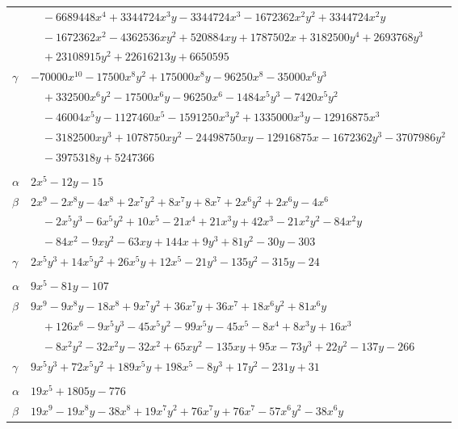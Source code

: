 \documentclass[11pt]{article}
\begin{document}
\begin{longtable}{@{}ll@{}}
 & $\quad -6689448x^{4}+3344724x^{3}y-3344724x^{3}-1672362x^{2}y^{2}+3344724x^{2}y$\\
 & $\quad -1672362x^{2}-4362536xy^{2}+520884xy+1787502x+3182500y^{4}+2693768y^{3}$\\
 & $\quad +23108915y^{2}+22616213y+6650595$\\
$\gamma$ & $-70000x^{10}-17500x^{8}y^{2}+175000x^{8}y-96250x^{8}-35000x^{6}y^{3}$\\
 & $\quad +332500x^{6}y^{2}-17500x^{6}y-96250x^{6}-1484x^{5}y^{3}-7420x^{5}y^{2}$\\
 & $\quad -46004x^{5}y-1127460x^{5}-1591250x^{3}y^{2}+1335000x^{3}y-12916875x^{3}$\\
 & $\quad -3182500xy^{3}+1078750xy^{2}-24498750xy-12916875x-1672362y^{3}-3707986y^{2}$\\
 & $\quad -3975318y+5247366$\\
\addlinespace[3pt]
\multicolumn{2}{@{}l}{$\{i,j\}=\{13,26\}$, $k_{ij}=3^{4}\cdot 7$}\\
$\alpha$ & $2x^{5}-12y-15$\\
$\beta$ & $2x^{9}-2x^{8}y-4x^{8}+2x^{7}y^{2}+8x^{7}y+8x^{7}+2x^{6}y^{2}+2x^{6}y-4x^{6}$\\
 & $\quad -2x^{5}y^{3}-6x^{5}y^{2}+10x^{5}-21x^{4}+21x^{3}y+42x^{3}-21x^{2}y^{2}-84x^{2}y$\\
 & $\quad -84x^{2}-9xy^{2}-63xy+144x+9y^{3}+81y^{2}-30y-303$\\
$\gamma$ & $2x^{5}y^{3}+14x^{5}y^{2}+26x^{5}y+12x^{5}-21y^{3}-135y^{2}-315y-24$\\
\addlinespace[3pt]
\multicolumn{2}{@{}l}{$\{i,j\}=\{13,27\}$, $k_{ij}=5^{2}\cdot 17$}\\
$\alpha$ & $9x^{5}-81y-107$\\
$\beta$ & $9x^{9}-9x^{8}y-18x^{8}+9x^{7}y^{2}+36x^{7}y+36x^{7}+18x^{6}y^{2}+81x^{6}y$\\
 & $\quad +126x^{6}-9x^{5}y^{3}-45x^{5}y^{2}-99x^{5}y-45x^{5}-8x^{4}+8x^{3}y+16x^{3}$\\
 & $\quad -8x^{2}y^{2}-32x^{2}y-32x^{2}+65xy^{2}-135xy+95x-73y^{3}+22y^{2}-137y-266$\\
$\gamma$ & $9x^{5}y^{3}+72x^{5}y^{2}+189x^{5}y+198x^{5}-8y^{3}+17y^{2}-231y+31$\\
\addlinespace[3pt]
\multicolumn{2}{@{}l}{$\{i,j\}=\{13,28\}$, $k_{ij}=2^{9}\cdot 5\cdot 11$}\\
$\alpha$ & $19x^{5}+1805y-776$\\
$\beta$ & $19x^{9}-19x^{8}y-38x^{8}+19x^{7}y^{2}+76x^{7}y+76x^{7}-57x^{6}y^{2}-38x^{6}y$\\

\end{longtable}
\end{document}
